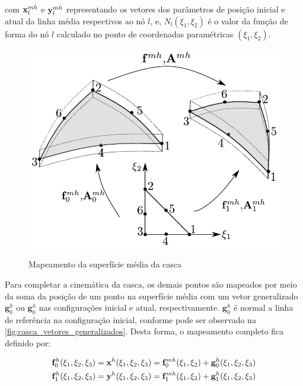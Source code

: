 \noindent com $\mathbf{x}_{l}^{mh}$ e $\mathbf{y}_{l}^{mh}$ representando os vetores dos parâmetros de posição inicial e atual da linha média respectivos ao nó $l$, e, $N_{l} (\xi_{1},\xi_{2})$ é o valor da função de forma do nó $l$ calculado no ponto de coordenadas paramétricas $(\xi_{1},\xi_{2})$.

\begin{figure}[!htbp]
	\caption{Mapeamento da superfície média da casca}
	\centering
	\includegraphics[scale=0.8,trim=0cm 0.0cm 0cm 0cm, clip=true]{Imagens/Cap4/casca_super_media.pdf}	
	\label{fig:casca:map_super_media}
\end{figure}

Para completar a cinemática da casca, os demais pontos são mapeados por meio da soma da posição de um ponto na superfície média com um vetor generalizado $\mathbf{g}^{h}_{0}$ ou $\mathbf{g}^{h}_{0}$ nas configurações inicial e atual, respectivamente.  $\mathbf{g}^{h}_{0}$ é normal a linha de referência na configuração inicial, conforme pode ser observado na \autoref{fig:casca_vetores_generalizados}. Desta forma, o mapeamento completo fica definido por:

\begin{align}
\mathbf{f}^{h}_{0}(\xi_{1},\xi_{2},\xi_{3}) = \mathbf{x}^{h}(\xi_{1},\xi_{2},\xi_{3}) = \mathbf{f}^{mh}_{0}(\xi_{1},\xi_{2}) + \mathbf{g}^{h}_{0} (\xi_{1},\xi_{2}, \xi_{3}) \label{eq:fmap0}\\
\mathbf{f}^{h}_{1}(\xi_{1},\xi_{2},\xi_{3}) = \mathbf{y}^{h}(\xi_{1},\xi_{2},\xi_{3}) = \mathbf{f}^{mh}_{1}(\xi_{1},\xi_{2}) + \mathbf{g}^{h}_{1} (\xi_{1},\xi_{2}, \xi_{3})  \label{eq:fmap1}
\end{align}

